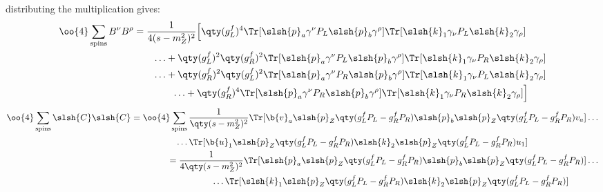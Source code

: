 	distributing the multiplication gives:
	\begin{align}
		\label{eqn:BnBp_result}
		\begin{split}
			\oo{4}\sum_\text{spins}B^\nu B^\rho&=\frac{1}{4(s-m_Z^2)^2}
			\Big[
			\qty(g_L^f)^4
			\Tr[\slsh{p}_a\gamma^\nu P_L\slsh{p}_b\gamma^\rho]
			\Tr[\slsh{k}_1\gamma_\nu P_L\slsh{k}_2\gamma_\rho]
			\\&\qquad\ldots+
			\qty(g_L^f)^2\qty(g_R^f)^2
			\Tr[\slsh{p}_a\gamma^\nu P_L\slsh{p}_b\gamma^\rho]
			\Tr[\slsh{k}_1\gamma_\nu P_R\slsh{k}_2\gamma_\rho]
			\\&\qquad\ldots+
			\qty(g_R^f)^2\qty(g_L^f)^2
			\Tr[ \slsh{p}_a\gamma^\nu P_R\slsh{p}_b\gamma^\rho]
			\Tr[\slsh{k}_1\gamma_\nu P_L\slsh{k}_2\gamma_\rho]
			\\&\qquad\qquad\ldots+
			\qty(g_R^f)^4
			\Tr[ \slsh{p}_a\gamma^\nu P_R\slsh{p}_b\gamma^\rho]
			\Tr[\slsh{k}_1\gamma_\nu P_R\slsh{k}_2\gamma_\rho]
			\Big]
		\end{split}
	\end{align}
\newpage
	\begin{align}
		\begin{split}
			\oo{4}\sum_\text{spins}\slsh{C}\slsh{C}
			&=\oo{4}\sum_\text{spins}
			\frac{1}{\qty(s-m_Z^2)^2}
			\Tr[\b{v}_a\slsh{p}_Z\qty(g_L^fP_L-g_R^fP_R)\slsh{p}_b\slsh{p}_Z\qty(g_L^fP_L-g_R^fP_R)v_a]
			\ldots\\&\qquad\qquad\quad\ldots
			\Tr[\b{u}_1\slsh{p}_Z\qty(g_L^fP_L-g_R^fP_R)\slsh{k}_2\slsh{p}_Z\qty(g_L^fP_L-g_R^fP_R)u_1]
		\end{split}
		\\
		\begin{split}
			&=\frac{1}{4\qty(s-m_Z^2)^2}
			\Tr[\slsh{p}_a\slsh{p}_Z\qty(g_L^fP_L-g_R^fP_R)\slsh{p}_b\slsh{p}_Z\qty(g_L^fP_L-g_R^fP_R)]
			\ldots\\&\qquad\qquad\quad\ldots
			\Tr[\slsh{k}_1\slsh{p}_Z\qty(g_L^fP_L-g_R^fP_R)\slsh{k}_2\slsh{p}_Z\qty(g_L^fP_L-g_R^fP_R)]
		\end{split}
	\end{align}

